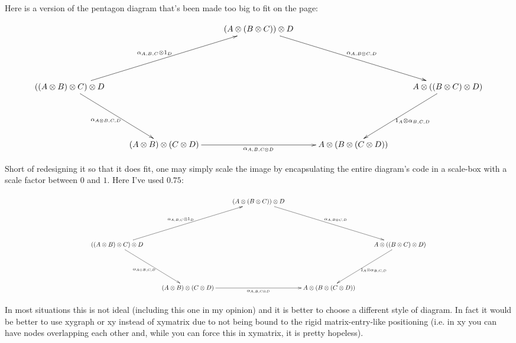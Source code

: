 \documentclass[a4paper,10pt]{article}
\numberwithin{equation}{section}
\begin{document}
\noindent Here is a version of the pentagon diagram that's been made too big to fit on the page:

$$\xymatrix{
& & (A \otimes (B \otimes C)) \otimes D \ar[rrdd]^-{\phantom{A}\alpha_{A,B\otimes C,D}}  & & \\
& & & & \\
((A \otimes B )\otimes C) \otimes D \ar[rruu]^-{\alpha_{A,B,C}\otimes 1_{D}\phantom{A}} \ar[rdd]_-{\alpha_{A\otimes B,C,D}} & & & & A \otimes ((B \otimes C) \otimes D ) \ar[ldd]^-{1_{A}\otimes\alpha_{B,C,D}} \\
& & & & \\
& (A \otimes B) \otimes (C \otimes D) \ar[rr]_-{\alpha_{A,B,C\otimes D }} && A \otimes (B \otimes (C \otimes D)) &
}$$
\newline
\newline


\noindent Short of redesigning it so that it does fit, one may simply scale the image by encapsulating the entire diagram's code in a scale-box with a scale factor between $0$ and $1$.
Here I've used $0.75$:

$$\scalebox{0.75}{\xymatrix{
& & (A \otimes (B \otimes C)) \otimes D \ar[rrdd]^-{\phantom{A}\alpha_{A,B\otimes C,D}}  & & \\
& & & & \\
((A \otimes B )\otimes C) \otimes D \ar[rruu]^-{\alpha_{A,B,C}\otimes 1_{D}\phantom{A}} \ar[rdd]_-{\alpha_{A\otimes B,C,D}} & & & & A \otimes ((B \otimes C) \otimes D ) \ar[ldd]^-{1_{A}\otimes\alpha_{B,C,D}} \\
& & & & \\
& (A \otimes B) \otimes (C \otimes D) \ar[rr]_-{\alpha_{A,B,C\otimes D }} && A \otimes (B \otimes (C \otimes D)) &
}}$$
\newline

\noindent In most situations this is not ideal (including this one in my opinion) and it is better to choose a different style of diagram.
In fact it would be better to use xygraph or xy instead of xymatrix due to not being bound to the rigid matrix-entry-like positioning (i.e. in xy you can have nodes overlapping each other and, while you can force this in xymatrix, it is pretty hopeless).
\end{document}
